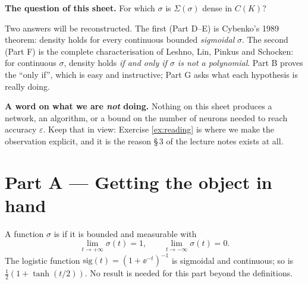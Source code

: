 \documentclass[11pt,a4paper]{article}
\begin{document}
\noindent
\textbf{The question of this sheet.} For which $\sigma$ is $\Sigma(\sigma)$ dense in $C(K)$?

\smallskip
\noindent
Two answers will be reconstructed. The first (Part D--E) is Cybenko's 1989 theorem: density holds
for every continuous bounded \emph{sigmoidal} $\sigma$. The second (Part F) is the complete
characterisation of Leshno, Lin, Pinkus and Schocken: for continuous $\sigma$, density holds
\emph{if and only if $\sigma$ is not a polynomial}. Part B proves the ``only if'', which is easy and
instructive; Part G asks what each hypothesis is really doing.

\begin{warnbox}
\textbf{A word on what we are \emph{not} doing.} Nothing on this sheet produces a network, an
algorithm, or a bound on the number of neurons needed to reach accuracy $\varepsilon$. Keep that in
view: Exercise \ref{ex:reading} is where we make the observation explicit, and it is the reason
§\,3 of the lecture notes exists at all.
\end{warnbox}

\section{Part A --- Getting the object in hand}

\begin{setting}
A function $\sigma$ is  if it is bounded and measurable with
\[
\lim_{t\to+\infty}\sigma(t) = 1, \qquad \lim_{t\to-\infty}\sigma(t) = 0 .
\]
The logistic function $\mathrm{sig}(t) = (1+\ee^{-t})^{-1}$ is sigmoidal and continuous; so is
$\tfrac12(1+\tanh(t/2))$. No result is needed for this part beyond the definitions.
\end{setting}
\end{document}
